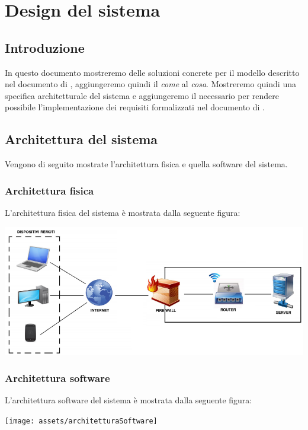 \chapter{Design del sistema}

\section{Introduzione}
In questo documento mostreremo delle soluzioni concrete per il modello descritto nel documento di , aggiungeremo quindi il \emph{come} al \emph{cosa}. Mostreremo quindi una specifica architetturale del sistema e aggiungeremo il necessario per rendere possibile l'implementazione dei requisiti formalizzati nel documento di .

\section{Architettura del sistema}
Vengono di seguito mostrate l'architettura fisica e quella software del sistema.

\subsection{Architettura fisica}
L'architettura fisica del sistema è mostrata dalla seguente figura:
\begin{center}
   \includegraphics[width=\textwidth]{assets/architetturaFisica}
\end{center}

\subsection{Architettura software}
L'architettura software del sistema è mostrata dalla seguente figura:
\begin{center}
   \texttt{[image: assets/architetturaSoftware]}
\end{center}

